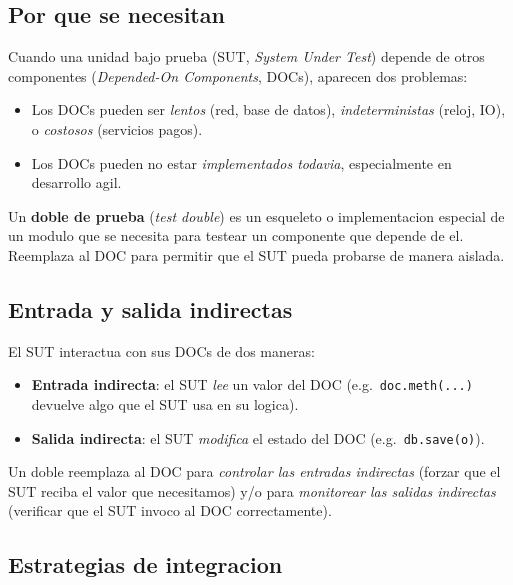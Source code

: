 \documentclass[12pt,a4paper]{article}
\begin{document}
\subsection{Por que se necesitan}

Cuando una unidad bajo prueba (SUT, \emph{System Under Test}) depende de otros componentes
(\emph{Depended-On Components}, DOCs), aparecen dos problemas:

\begin{itemize}
  \item Los DOCs pueden ser \emph{lentos} (red, base de datos), \emph{indeterministas}
  (reloj, IO), o \emph{costosos} (servicios pagos).
  \item Los DOCs pueden no estar \emph{implementados todavia}, especialmente en desarrollo
  agil.
\end{itemize}

\begin{definicionbox}
Un \textbf{doble de prueba} (\emph{test double}) es un esqueleto o implementacion especial de
un modulo que se necesita para testear un componente que depende de el. Reemplaza al DOC para
permitir que el SUT pueda probarse de manera aislada.
\end{definicionbox}

\subsection{Entrada y salida indirectas}

El SUT interactua con sus DOCs de dos maneras:

\begin{itemize}
  \item \textbf{Entrada indirecta}: el SUT \emph{lee} un valor del DOC (e.g.\
  \texttt{doc.meth(...)} devuelve algo que el SUT usa en su logica).
  \item \textbf{Salida indirecta}: el SUT \emph{modifica} el estado del DOC (e.g.\
  \texttt{db.save(o)}).
\end{itemize}

\begin{ideabox}
Un doble reemplaza al DOC para \emph{controlar las entradas indirectas} (forzar que el SUT
reciba el valor que necesitamos) y/o para \emph{monitorear las salidas indirectas}
(verificar que el SUT invoco al DOC correctamente).
\end{ideabox}

\subsection{Estrategias de integracion}
\end{document}
